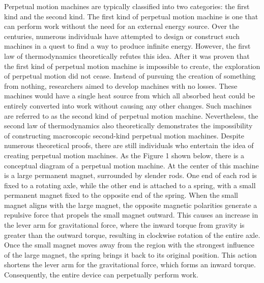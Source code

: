\documentclass[12pt]{article}
\begin{document}
Perpetual motion machines are typically classified into two categories: the first kind and the second kind. The first kind of perpetual motion machine is one that can perform work without the need for an external energy source. Over the centuries, numerous individuals have attempted to design or construct such machines in a quest to find a way to produce infinite energy. However, the first law of thermodynamics theoretically refutes this idea. After it was proven that the first kind of perpetual motion machine is impossible to create, the exploration of perpetual motion did not cease. Instead of pursuing the creation of something from nothing, researchers aimed to develop machines with no losses. These machines would have a single heat source from which all absorbed heat could be entirely converted into work without causing any other changes. Such machines are referred to as the second kind of perpetual motion machine. Nevertheless, the second law of thermodynamics also theoretically demonstrates the impossibility of constructing macroscopic second-kind perpetual motion machines. Despite numerous theoretical proofs, there are still individuals who entertain the idea of creating perpetual motion machines. As the Figure 1 shown below, there is a conceptual diagram of a perpetual motion machine. At the center of this machine is a large permanent magnet, surrounded by slender rods. One end of each rod is fixed to a rotating axle, while the other end is attached to a spring, with a small permanent magnet fixed to the opposite end of the spring. When the small magnet aligns with the large magnet, the opposite magnetic polarities generate a repulsive force that propels the small magnet outward. This causes an increase in the lever arm for gravitational force, where the inward torque from gravity is greater than the outward torque, resulting in clockwise rotation of the entire axle. Once the small magnet moves away from the region with the strongest influence of the large magnet, the spring brings it back to its original position. This action shortens the lever arm for the gravitational force, which forms an inward torque. Consequently, the entire device can perpetually perform work.
\end{document}
